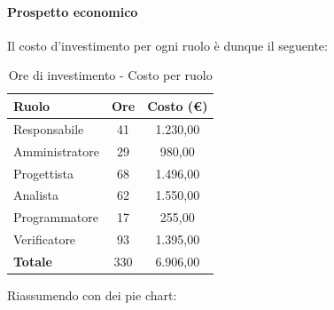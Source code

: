 \documentclass[../PianoProgetto.tex]{subfiles}
\begin{document}
	\paragraph{Prospetto economico}
					Il costo d'investimento per ogni ruolo è dunque il seguente:
	\begin{table}[h]
		\centering
		\begin{tabular}{l * {2}{c}}
			\toprule
			\textbf{Ruolo} & \textbf{Ore} & \textbf{Costo (\euro{})} \\
			\midrule
			Responsabile &	41 &  1.230,00 \\
			Amministratore & 29 & 980,00 \\
			Progettista & 68 & 1.496,00 \\
			Analista & 62 & 1.550,00 \\
			Programmatore & 17 & 255,00 \\
			Verificatore & 93 & 1.395,00 \\
			\midrule		
			\textbf{Totale} & 330 & 6.906,00 \\
			\bottomrule
		\end{tabular}
		\caption{Ore di investimento - Costo per ruolo}
		\label{tab:investimento_costo}
	\end{table}
\vfill	
	Riassumendo con dei pie chart:
\end{document}
